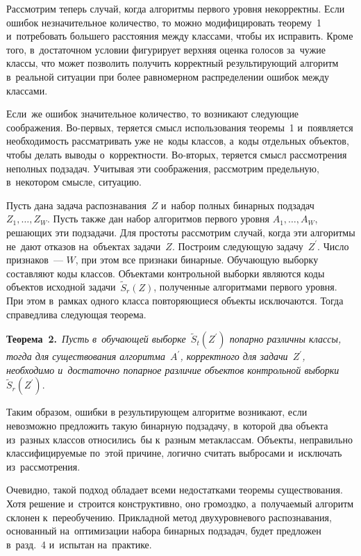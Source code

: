 \begin{multicols}{2}
Рассмотрим теперь случай, когда алгоритмы первого уровня некорректны.
Если ошибок незначительное количество, то можно модифицировать 
теорему~1 и~потребовать большего расстояния между классами, чтобы их исправить.
Кроме того, в~достаточном условии фигурирует верхняя оценка голосов 
за~чужие классы, что может позволить получить корректный результирующий алгоритм 
в~реальной ситуации при более равномерном распределении ошибок между классами.

Если~же ошибок значительное количество, то возникают следующие соображения.
Во-пер\-вых, теряется смысл использования теоремы~1 
и~появляется необходимость рассматривать уже не~коды классов, 
а~коды отдельных объектов, чтобы делать выводы о~корректности.
Во-вто\-рых, теряется смысл рассмотрения неполных подзадач.
Учитывая эти соображения, рассмотрим предельную, в~некотором смысле, ситуацию.


Пусть дана задача распознавания~$Z$ и~набор полных бинарных подзадач %
 $Z_1,\ldots,Z_W$.
Пусть также дан набор алгоритмов первого уровня $A_1,\ldots,A_W$, решающих эти подзадачи.
Для простоты рас\-смот\-рим случай, когда эти алгоритмы не~дают отказов на~объектах
задачи~$Z$. %
Построим следующую задачу~$Z^\prime$.
Число признаков~--- $W$, при этом все признаки бинарные.
Обуча\-ющую выборку составляют коды классов.
Объектами контрольной выборки являются коды объектов исходной задачи~$\tilde{S}_r(Z)$, 
полученные алгоритмами первого уровня.
При этом в~рамках одного класса повторяющиеся объекты исключаются.
Тогда справедлива следующая тео\-рема.

\smallskip

\noindent
\textbf{Теорема~2.}\
\textit{Пусть в~обучающей выборке~$\tilde{S}_t(Z^\prime)$ попарно различны классы,
тогда для существования алгоритма~$A^\prime$, корректного для задачи~$Z^\prime$, 
необходимо и~достаточно попарное различие объектов контрольной 
выборки}~$\tilde{S}_r(Z^\prime)$.


\smallskip

Таким образом, ошибки в результирующем алгоритме возникают, 
если невозможно предложить такую бинарную подзадачу, в~которой два 
объекта из~разных классов относились~бы к~разным метаклассам.
Объекты, неправильно классифициру\-емые по~этой причине, логично считать 
выбросами и~исключать из~рассмотрения.

Очевидно, такой подход обладает всеми недостатками теоремы существования.
Хотя решение и~строится конструктивно, оно громоздко, 
а~получаемый алгоритм склонен к~переобучению.
Прикладной метод двухуровневого распознавания, основанный на~оптимизации 
набора бинарных подзадач, будет предложен в~разд.~4 и~испытан на~практике.


\end{multicols}
